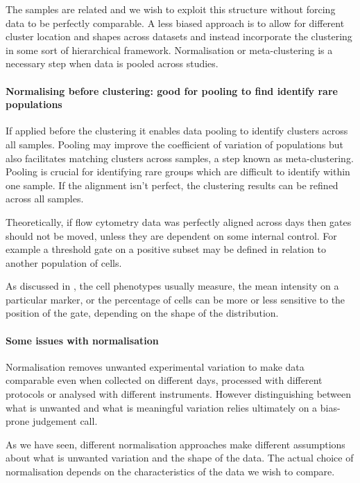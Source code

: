The samples are related and we wish to exploit this structure without forcing data to be perfectly comparable.
A less biased approach is to allow for different cluster location and shapes across datasets and instead incorporate the clustering in some sort of hierarchical framework.  
Normalisation or meta-clustering is a necessary step when data is pooled across studies.


\paragraph{Normalising before clustering: good for pooling to find identify rare populations}

If applied before the clustering it enables data pooling to identify clusters across all samples.
Pooling may improve the coefficient of variation of populations but also facilitates
matching clusters across samples, a step known as meta-clustering.
Pooling is crucial for identifying rare groups which are difficult to identify within one sample.
If the alignment isn’t perfect, the clustering results can be refined across all samples.

Theoretically, if flow cytometry data was perfectly aligned across days then gates should not be moved, unless they are dependent on some internal control.  
For example a threshold gate on a positive subset may be defined in relation to another population of cells.

As discussed in , the cell phenotypes usually measure, the mean intensity on a particular marker, or the percentage of cells can be more or less sensitive to the position of the gate, depending on the shape of the distribution.


\paragraph{Some issues with normalisation}

Normalisation removes unwanted experimental variation to make data comparable even when collected on different days,
processed with different protocols or analysed with different instruments.
However distinguishing between what is unwanted and what is meaningful variation relies ultimately on a bias-prone judgement call.

As we have seen, different normalisation approaches make different assumptions about what is unwanted variation and the shape of the data.
The actual choice of normalisation depends on the characteristics of the data we wish to compare.

